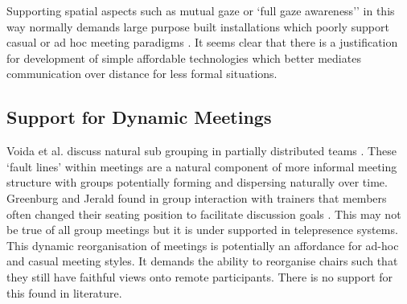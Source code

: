             Supporting spatial aspects such as mutual gaze or `full gaze awareness'' \cite{Monk2002} in this way normally demands large purpose built installations which poorly support casual or ad hoc meeting paradigms \cite{Schroeder2001, Wolff2008}. It seems clear that there is a justification for development of simple affordable technologies which better mediates communication over distance for less formal situations.           


\subsection{Support for Dynamic Meetings}
Voida et al. discuss natural sub grouping in partially distributed teams \cite{Voida2012}. These `fault lines' within meetings are a natural component of more informal meeting structure with groups potentially forming and dispersing naturally over time. \\           
Greenburg and Jerald found in group interaction with trainers that members often changed their seating position to facilitate discussion goals \cite{greenberg1976role}. This may not be true of all group meetings but it is under supported in telepresence systems.\\
            This dynamic reorganisation of meetings is potentially an affordance for ad-hoc and casual meeting styles. It demands the ability to reorganise chairs such that they still have faithful views onto remote participants. There is no support for this found in literature.\\


